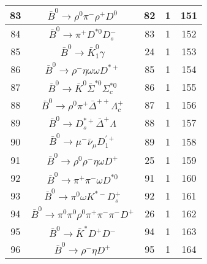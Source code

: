 \documentclass[landscape]{article}
\begin{document}
\begin{table}[htbp!]
\begin{tabular}{|c|c|c|c|c|}
\hline
83 & $ \bar{B}^{0} \rightarrow \rho^{0} \pi^{-} \rho^{+} D^{0} $ & 82 & 1 & 151 \\
\hline
84 & $ \bar{B}^{0} \rightarrow \pi^{+} D^{*0} D_{s}^{-} $ & 83 & 1 & 152 \\
\hline
85 & $ \bar{B}^{0} \rightarrow \bar{K}_1^{0} \gamma $ & 24 & 1 & 153 \\
\hline
86 & $ \bar{B}^{0} \rightarrow \rho^{-} \eta \omega \omega D^{*+} $ & 85 & 1 & 154 \\
\hline
87 & $ \bar{B}^{0} \rightarrow \bar{K}^{0} \bar{\Sigma}^{*0} \Sigma_{c}^{*0} $ & 86 & 1 & 155 \\
\hline
88 & $ \bar{B}^{0} \rightarrow \rho^{0} \pi^{+} \bar{\Delta}^{++} \Lambda_{c}^{+} $ & 87 & 1 & 156 \\
\hline
89 & $ \bar{B}^{0} \rightarrow D_{s}^{*+} \bar{\Delta}^{+} \Lambda $ & 88 & 1 & 157 \\
\hline
90 & $ \bar{B}^{0} \rightarrow \mu^{-} \bar{\nu}_{\mu} D_{1}^{\prime+} $ & 89 & 1 & 158 \\
\hline
91 & $ \bar{B}^{0} \rightarrow \rho^{0} \rho^{-} \eta \omega D^{+} $ & 25 & 1 & 159 \\
\hline
92 & $ \bar{B}^{0} \rightarrow \pi^{+} \pi^{-} \omega D^{*0} $ & 91 & 1 & 160 \\
\hline
93 & $ \bar{B}^{0} \rightarrow \pi^{0} \omega K^{*-} D_{s}^{+} $ & 92 & 1 & 161 \\
\hline
94 & $ \bar{B}^{0} \rightarrow \pi^{0} \pi^{0} \rho^{0} \pi^{+} \pi^{-} \pi^{-} D^{+} $ & 26 & 1 & 162 \\
\hline
95 & $ \bar{B}^{0} \rightarrow \bar{K}^{*} D^{+} D^{-} $ & 94 & 1 & 163 \\
\hline
96 & $ \bar{B}^{0} \rightarrow \rho^{-} \eta D^{+} $ & 95 & 1 & 164 \\
\hline
\end{tabular}
\end{table}

\clearpage
\end{document}
